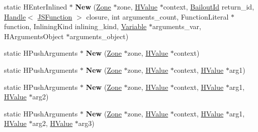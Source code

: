 \begin{DoxyCompactItemize}
\item 
\hypertarget{classv8_1_1internal_1_1_v8___f_i_n_a_l_ae73d4e65716b4d8a7cd0eef48de81e19}{}static H\+Enter\+Inlined $\ast$ {\bfseries New} (\hyperlink{classv8_1_1internal_1_1_zone}{Zone} $\ast$zone, \hyperlink{classv8_1_1internal_1_1_h_value}{H\+Value} $\ast$context, \hyperlink{classv8_1_1internal_1_1_bailout_id}{Bailout\+Id} return\+\_\+id, \hyperlink{classv8_1_1internal_1_1_handle}{Handle}$<$ \hyperlink{classv8_1_1internal_1_1_j_s_function}{J\+S\+Function} $>$ closure, int arguments\+\_\+count, Function\+Literal $\ast$function, Inlining\+Kind inlining\+\_\+kind, \hyperlink{classv8_1_1internal_1_1_variable}{Variable} $\ast$arguments\+\_\+var, H\+Arguments\+Object $\ast$arguments\+\_\+object)\label{classv8_1_1internal_1_1_v8___f_i_n_a_l_ae73d4e65716b4d8a7cd0eef48de81e19}

\item 
\hypertarget{classv8_1_1internal_1_1_v8___f_i_n_a_l_af6f83d443f854d419900c6ee9aeae290}{}static H\+Push\+Arguments $\ast$ {\bfseries New} (\hyperlink{classv8_1_1internal_1_1_zone}{Zone} $\ast$zone, \hyperlink{classv8_1_1internal_1_1_h_value}{H\+Value} $\ast$context)\label{classv8_1_1internal_1_1_v8___f_i_n_a_l_af6f83d443f854d419900c6ee9aeae290}

\item 
\hypertarget{classv8_1_1internal_1_1_v8___f_i_n_a_l_a6a40f17cb35b143be665caaf5cc90e76}{}static H\+Push\+Arguments $\ast$ {\bfseries New} (\hyperlink{classv8_1_1internal_1_1_zone}{Zone} $\ast$zone, \hyperlink{classv8_1_1internal_1_1_h_value}{H\+Value} $\ast$context, \hyperlink{classv8_1_1internal_1_1_h_value}{H\+Value} $\ast$arg1)\label{classv8_1_1internal_1_1_v8___f_i_n_a_l_a6a40f17cb35b143be665caaf5cc90e76}

\item 
\hypertarget{classv8_1_1internal_1_1_v8___f_i_n_a_l_a8a4bee1c5f3e2205335f71268752b748}{}static H\+Push\+Arguments $\ast$ {\bfseries New} (\hyperlink{classv8_1_1internal_1_1_zone}{Zone} $\ast$zone, \hyperlink{classv8_1_1internal_1_1_h_value}{H\+Value} $\ast$context, \hyperlink{classv8_1_1internal_1_1_h_value}{H\+Value} $\ast$arg1, \hyperlink{classv8_1_1internal_1_1_h_value}{H\+Value} $\ast$arg2)\label{classv8_1_1internal_1_1_v8___f_i_n_a_l_a8a4bee1c5f3e2205335f71268752b748}

\item 
\hypertarget{classv8_1_1internal_1_1_v8___f_i_n_a_l_a53e175e07f90af0f5d64902567040d18}{}static H\+Push\+Arguments $\ast$ {\bfseries New} (\hyperlink{classv8_1_1internal_1_1_zone}{Zone} $\ast$zone, \hyperlink{classv8_1_1internal_1_1_h_value}{H\+Value} $\ast$context, \hyperlink{classv8_1_1internal_1_1_h_value}{H\+Value} $\ast$arg1, \hyperlink{classv8_1_1internal_1_1_h_value}{H\+Value} $\ast$arg2, \hyperlink{classv8_1_1internal_1_1_h_value}{H\+Value} $\ast$arg3)\label{classv8_1_1internal_1_1_v8___f_i_n_a_l_a53e175e07f90af0f5d64902567040d18}


\end{DoxyCompactItemize}
